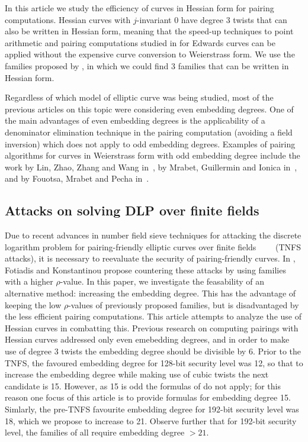 In this article we study the efficiency of curves in Hessian form for pairing computations. 
Hessian curves with $j$-invariant 0 have degree 3 twists that can also be written in Hessian form, meaning that the speed-up techniques to point arithmetic and pairing computations studied in \cite{2014/LWZ} for Edwards curves can be applied
without the expensive curve conversion to Weierstrass form.
We use the families proposed by \cite{2010/freeman}, in which we could find
3 families that can be written in Hessian form.

Regardless of which model of elliptic curve was being studied,
most of the previous articles on this topic were considering even embedding degrees.
One of the main advantages of even embedding degrees is the applicability of a denominator elimination technique in the pairing computation 
(avoiding a field inversion)
which does not apply to odd embedding degrees.
Examples of pairing algorithms for curves in Weierstrass form with odd embedding degree include
the work by Lin, Zhao, Zhang and Wang in~\cite{2008/lin}, by Mrabet, Guillermin and Ionica in~\cite{2009/deg15},
and by Fouotsa, Mrabet and Pecha in~\cite{2016/degodd}.

\subsection{Attacks on solving DLP over finite fields}

Due to recent advances in number field sieve techniques for attacking the discrete logarithm problem for pairing-friendly elliptic curves over finite fields~\cite{2013/jouxP}~\cite{2016/KB}~\cite{2015/BGGM}~\cite{2015/BGK} (TNFS attacks),
it is necessary to reevaluate the security of pairing-friendly curves.
In \cite{2018/FK}, Fotiadis and Konstantinou propose countering these attacks by using families with a higher $\rho$-value. 
In this paper, we investigate the feasability of an alternative method: increasing the embedding degree.
This has the advantage of keeping the low $\rho$-values of previously proposed families, but is disadvantaged by the less efficient pairing computations.
This article attempts to analyze the use of Hessian curves in combatting this.
Previous research on computing pairings with  Hessian curves addressed only even emebedding degrees, and in order to make use of degree 3 twists the embedding degree should be divisible by 6. 
Prior to the TNFS, the favoured embedding degree for 128-bit security level was 12, 
so that to increase the embedding degree while making use of cubic twists the next
candidate is 15. However, as 15 is odd the formulas of \cite{2010/Gu} do not apply;
for this reason one focus of this article is to provide formulas for embedding degree 15. Simlarly, the pre-TNFS favourite embedding degree for 192-bit security level was 18, which we propose to increase to 21.
Observe further that for 192-bit security level, the families of \cite{2018/FK} all require embedding degree $>21$.


